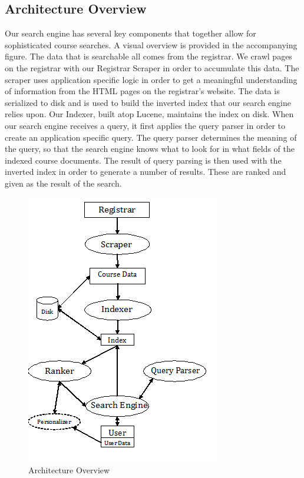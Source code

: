 \documentclass[12pt,letterpaper]{article}
\begin{document}
\subsection{Architecture Overview}
Our search engine has several key components that together allow for sophisticated course searches. A visual overview is provided in the accompanying figure. The data that is searchable all comes from the registrar. We crawl pages on the registrar with our Registrar Scraper in order to accumulate this data. The scraper uses application specific logic in order to get a meaningful understanding of information from the HTML pages on the registrar's website. The data is serialized to disk and is used to build the inverted index that our search engine relies upon. Our Indexer, built atop Lucene, maintains the index on disk. When our search engine receives a query, it first applies the query parser in order to create an application specific query. The query parser determines the meaning of the query, so that the search engine knows what to look for in what fields of the indexed course documents. The result of query parsing is then used with the inverted index in order to generate a number of results. These are ranked and given as the result of the search.

\begin{figure}
\begin{center}
\includegraphics{OverallArchDiagram.png}
\end{center}
\caption{Architecture Overview}
\end{figure}
\end{document}
